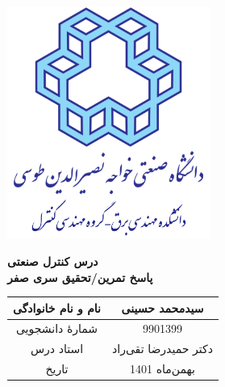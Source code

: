 \begin{titlepage}
\begin{center}
\includegraphics[width=0.5\textwidth]{KNTULogo.pdf}\\
 
\vfill
        
\Huge
\textbf{درس کنترل صنعتی}\\
\textbf{پاسخ تمرین/تحقیق سری صفر}\\
        
\vfill
        
\begin{table}[ht]
    \centering
    \huge
    \begin{tabular}{|c|c|}
    \hline
    نام و نام خانوادگی & سیدمحمد حسینی\\
    \hline
    شمارۀ دانشجویی & 9901399\\
    \hline
    استاد درس & دکتر حمیدرضا تقی‌راد\\
    \hline
    تاریخ & بهمن‌ماه 1401\\
    \hline
    \end{tabular}
\end{table}
\end{center}
\end{titlepage}
